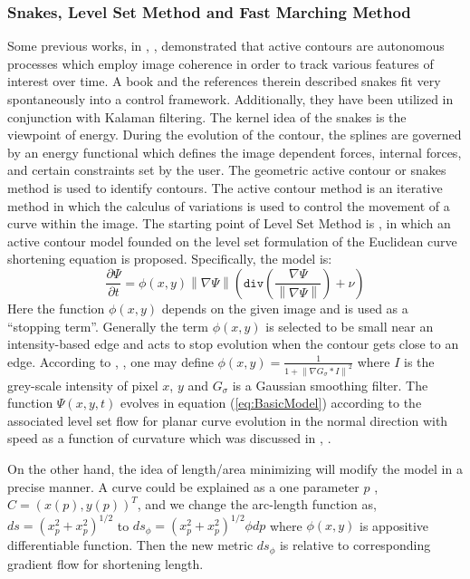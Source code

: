 \documentclass[letterpaper, 10 pt, conference]{ieeeconf}  %
\begin{document}
\subsubsection{Snakes, Level Set Method and Fast Marching Method}
Some previous works, in  \cite{betser2004automatic}, \cite{sattigeri2007vision}, demonstrated that active contours are autonomous processes which employ image coherence in order to track various features of interest over time. A book \cite{blake1998active} and the references therein described snakes fit very spontaneously into a control framework. Additionally, they have been utilized in conjunction with Kalaman filtering. The kernel idea of the snakes is the viewpoint of energy. During the evolution of the contour, the splines are governed by an energy functional which defines the image dependent forces, internal forces, and certain constraints set by the user. The geometric active contour or snakes method is used to identify contours. The active contour method is an iterative method in which the calculus of variations is used to control the movement of a curve within the image. 
The starting point of Level Set Method is  \cite{368173}, \cite{Caselles1993} in which an active contour model founded on the level set formulation of the Euclidean curve shortening equation is proposed. Specifically, the model is:
\begin{equation} \label{eq:BasicModel}
\frac{\partial \Psi}{\partial t} = \phi(x,y) \left\|\nabla\Psi\right\| (\texttt{div}(\frac{\nabla \Psi}{\left\|\nabla\Psi\right\|})+\nu) 
\end{equation}
Here the function $ \phi(x,y) $ depends on the given image and is used as a ``stopping term''. Generally the term  $ \phi(x,y) $ is selected to be small near an intensity-based edge and acts to stop evolution when the contour gets close to an edge. According to  \cite{368173}, \cite{Caselles1993}, one may define $\phi(x,y) = \frac{1}{1 + \left\| \nabla G_{\sigma} \ast I \right\|^2 }$ where $I$  is the grey-scale intensity of pixel $x$, $y$ and $ G_{\sigma} $  is a Gaussian smoothing filter.  The function  $ \Psi(x,y,t)  $ evolves in equation (\ref{eq:BasicModel}) according to the associated level set flow for planar curve evolution in the normal direction with speed as a function of curvature which was discussed in \cite{sethian1985curvature}, \cite{osher1988fronts}. 

On the other hand, the idea of length/area minimizing will modify the model in a precise manner. A curve could be explained as a one parameter $p$ , $C=(x(p),y(p))^T$, and we change the arc-length function as, $ds = (x_p^2 + x_p^2)^{1/2}$ to $ds_\phi = (x_p^2 + x_p^2)^{1/2} \phi dp$ where $\phi(x,y)$  is appositive differentiable function. Then the new metric $ ds_\phi$ is relative to corresponding gradient flow for shortening length.
\end{document}
